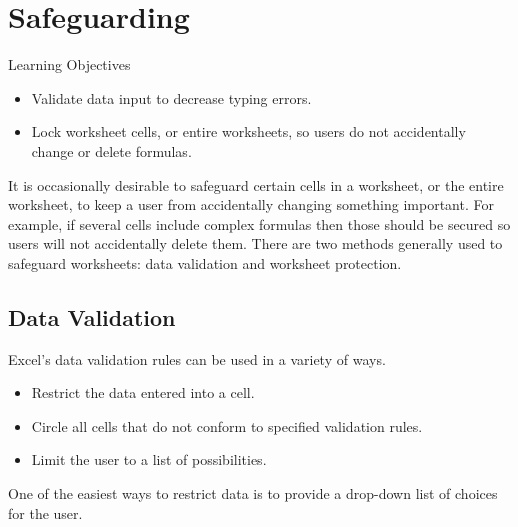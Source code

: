 \section{Safeguarding}

\begin{center}
	\begin{objbox}{Learning Objectives}
		\begin{itemize}
			\setlength{\itemsep}{0pt}
			\setlength{\parskip}{0pt}
			\setlength{\parsep}{0pt}
			
			\item Validate data input to decrease typing errors.
			\item Lock worksheet cells, or entire worksheets, so users do not accidentally change or delete formulas.
			
		\end{itemize}
	\end{objbox}
\end{center}

It is occasionally desirable to safeguard certain cells in a worksheet, or the entire worksheet, to keep a user from accidentally changing something important. For example, if several cells include complex formulas then those should be secured so users will not accidentally delete them. There are two methods generally used to safeguard worksheets: data validation and worksheet protection. 

\subsection{Data Validation}

Excel's data validation rules can be used in a variety of ways.

\begin{itemize}
	\item Restrict the data entered into a cell.
	\item Circle all cells that do not conform to specified validation rules.
	\item Limit the user to a list of possibilities.
\end{itemize}

One of the easiest ways to restrict data is to provide a drop-down list of choices for the user. 

